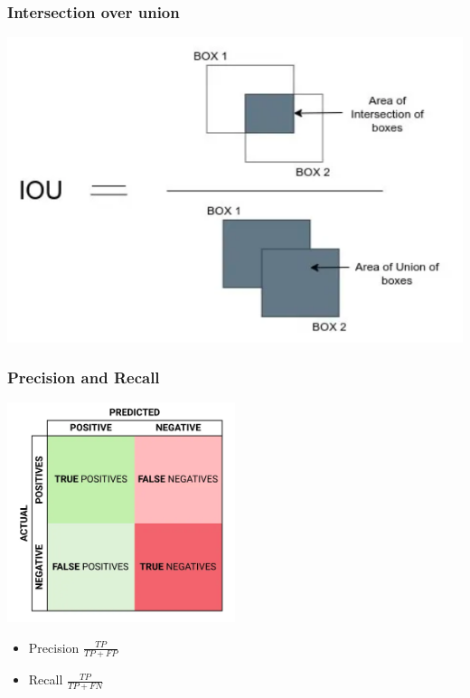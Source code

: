 \documentclass{beamer}
\begin{document}
\begin{frame}
	\frametitle{Intersection over union}
\begin{center}
	\includegraphics[width=\textwidth]{figs/iou.png}
\end{center}
\end{frame}
\begin{frame}
	\frametitle{Precision and Recall}
	\begin{center}
		\includegraphics[width=0.5\textwidth]{figs/confusion-mat.png}
		\href{https://towardsdatascience.com/precision-and-recall-88a3776c8007}{}
	\end{center}
\begin{itemize}
	\item Precision $\frac{TP}{TP+FP}$
	\item Recall $\frac{TP}{TP+FN}$
\end{itemize}
\end{frame}
\end{document}
